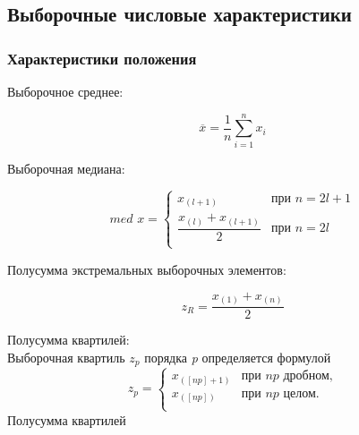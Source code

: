 \documentclass[a4paper]{article}
\begin{document}
    \subsection{Выборочные числовые характеристики}
        \subsubsection{Характеристики положения}
            \begin{itemize}
                \begin{item}
                    Выборочное среднее:
                \end{item}
                \begin{equation}\label{mean}
                    \overline{\textit{x}} = \dfrac{1}{\textit{n}}\sum\limits_{i=1}^n x_i
                \end{equation}
                
                \begin{item}
                    Выборочная медиана:
                \end{item}
                \begin{equation}\label{med}
                    \textit{med x} = \begin{cases}
                                            x_{(l + 1)} & \text{при $n = 2l + 1$}\\
                                            \dfrac{x_{(l)} + x_{(l + 1)}}{2} & \text{при $n = 2l$}\\
                                       \end{cases}
                \end{equation}
                
                \begin{item}
                    Полусумма экстремальных выборочных элементов:
                \end{item}
                \begin{equation}\label{extr}
                    \textit{z}_R = \dfrac{x_{(1)} + x_{(n)}}{2}
                \end{equation}
                
                \begin{item}
                    Полусумма квартилей:\\
                    Выборочная квартиль $z_p$ порядка \textit{p} определяется формулой
                    \begin{equation}
                        z_p = \begin{cases}
                                            x_{([np] + 1)} & \text{при $np$ дробном,}\\
                                            x_{([np])} & \text{при $np$ целом.}\\
                                       \end{cases}
                    \end{equation}
                    Полусумма квартилей
                    

\end{item}
\end{itemize}
\end{document}
